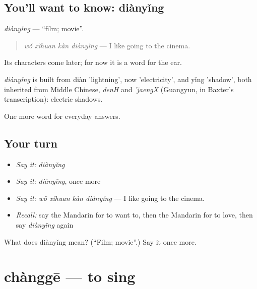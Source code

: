 \subsection*{You'll want to know: diànyǐng}
\emph{diànyǐng} — \textquotedblleft{}film; movie\textquotedblright{}.

\begin{quote}
\emph{wǒ xǐhuan kàn diànyǐng} — I like going to the cinema.
\end{quote}

Its characters come later; for now it is a word for the ear.

\begin{cousinweb}
\emph{diànyǐng} is built from diàn 'lightning', now 'electricity', and yǐng 'shadow', both inherited from Middle Chinese, \emph{denH} and \emph{'jaengX} (Guangyun, in Baxter's transcription): electric shadows.
\end{cousinweb}

\begin{grammarlens}[title={What you've built}]
One more word for everyday answers.
\end{grammarlens}

\subsection*{Your turn}
\begin{itemize}
\raggedright
  \item \emph{Say it:} \emph{diànyǐng}
  \item \emph{Say it:} \emph{diànyǐng}, once more
  \item \emph{Say it:} \emph{wǒ xǐhuan kàn diànyǐng} — I like going to the cinema.
  \item \emph{Recall:} say the Mandarin for to want to, then the Mandarin for to love, then say \emph{diànyǐng} again
\end{itemize}

\begin{tcolorbox}[breakable,colback=teal!4,colframe=teal!35!black,title={Before you move on}]
What does diànyǐng mean? (\textquotedblleft{}Film; movie\textquotedblright{}.) Say it once more.
\end{tcolorbox}
\section[chànggē]{chànggē — to sing}

\label{lesson:ZH-C55-changge}



